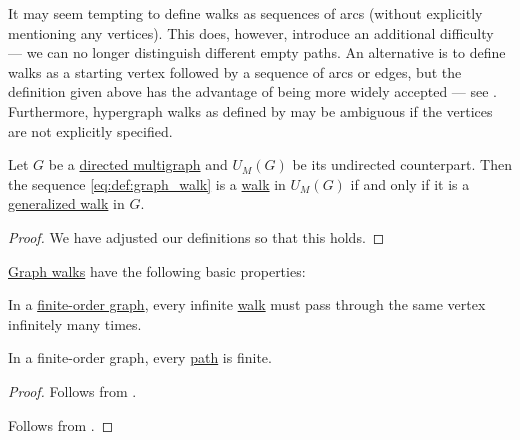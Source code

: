 \begin{comments}
  \item It may seem tempting to define walks as sequences of arcs (without explicitly mentioning any vertices). This does, however, introduce an additional difficulty --- we can no longer distinguish different empty paths. An alternative is to define walks as a starting vertex followed by a sequence of arcs or edges, but the definition given above has the advantage of being more widely accepted --- see . Furthermore, hypergraph walks as defined by \cite[300]{ЕмеличевИПр1990Графы} may be ambiguous if the vertices are not explicitly specified.
\end{comments}

\begin{proposition}\label{thm:walk_in_undirected_counterpart}
  Let \( G \) be a \hyperref[def:directed_multigraph]{directed multigraph} and \( \hyperref[def:graph_functors/multi_forgetful]{U_M}(G) \) be its undirected counterpart. Then the sequence \eqref{eq:def:graph_walk} is a \hyperref[def:graph_walk/undirected]{walk} in \( \hyperref[def:graph_functors/multi_forgetful]{U_M}(G) \) if and only if it is a \hyperref[def:graph_walk/generalized]{generalized walk} in \( G \).
\end{proposition}
\begin{proof}
  We have adjusted our definitions so that this holds.
\end{proof}

\begin{proposition}\label{thm:def:graph_walk}
  \hyperref[def:graph_walk]{Graph walks} have the following basic properties:
  \begin{thmenum}
     In a \hyperref[def:graph_cardinality/order]{finite-order graph}, every infinite \hyperref[def:graph_walk]{walk} must pass through the same vertex infinitely many times.

     In a finite-order graph, every \hyperref[def:graph_walk/path]{path} is finite.
  \end{thmenum}
\end{proposition}
\begin{proof}
   Follows from .

   Follows from .
\end{proof}

